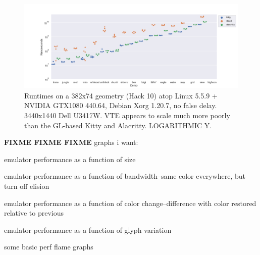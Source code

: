 \begin{figure}
\centering
\includegraphics[width=1\textwidth]{media/d0-large-nvidia.png}
\caption[382x74 NVIDIA GTX 1080 benchmarks.]{Runtimes on a 382x74 geometry (Hack 10) atop Linux 5.5.9 + NVIDIA GTX1080 440.64, Debian Xorg 1.20.7, no false delay. 3440x1440 Dell U3417W. VTE appears to scale much more poorly than the GL-based Kitty and Alacritty. LOGARITHMIC Y.}
\label{fig:nvidia-full}
\end{figure}

\textbf{FIXME FIXME FIXME}
graphs i want:
\begin{denseitemize}
\item{emulator performance as a function of size}
\item{emulator performance as a function of bandwidth--same color everywhere, but turn off elision}
\item{emulator performance as a function of color change--difference with color restored relative to previous}
\item{emulator performance as a function of glyph variation}
\item{some basic perf flame graphs}
\end{denseitemize}
